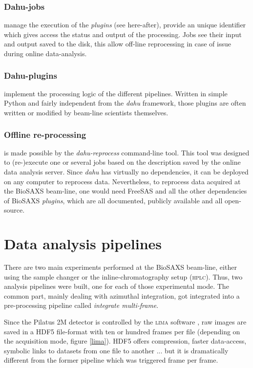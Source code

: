 \documentclass[preprint]{iucr}              %
\begin{document}
\subsubsection{Dahu-jobs}
manage the execution of the \textit{plugins} (see here-after), provide an unique identifier which gives access the status and output of the processing.
Jobs see their input and output saved to the disk, this allow off-line reprocessing in case of issue during online data-analysis.

\subsubsection{Dahu-plugins} implement the processing logic of the different pipelines.
Written in simple Python and fairly independent from the \textit{dahu} framework, those plugins are often written or modified by beam-line scientists themselves.

\subsubsection{Offline re-processing}
is made possible by the \textit{dahu-reprocess} command-line tool.
This tool was designed to (re-)execute one or several jobs based on the description saved by the online data analysis server. 
Since \textit{dahu} has virtually no dependencies, it can be deployed on any computer to reprocess data. 
Nevertheless, to reprocess data acquired at the BioSAXS beam-line, one would need FreeSAS and all the other dependencies of BioSAXS \textit{plugins}, which are all documented, publicly available and all open-source.

\section{Data analysis pipelines}
\label{pipeline}
There are two main experiments performed at the BioSAXS beam-line, either using the sample changer or the inline-chromatography setup (\textsc{hplc}).
Thus, two analysis pipelines were built, one for each of those experimental mode.
The common part, mainly dealing with azimuthal integration, got integrated into a pre-processing pipeline called \textit{integrate multi-frame}.

Since the Pilatus 2M detector is controlled by the \textsc{lima} software \cite{lima}, raw images are saved in a HDF5 file-format \cite{hdf5} with ten or hundred frames per file (depending on the acquisition mode, figure \ref{lima}).
HDF5 offers compression, faster data-access, symbolic links to datasets from one file to another ... but it is dramatically different from the former pipeline which was triggered frame per frame.
\end{document}
